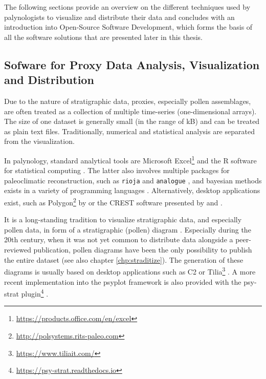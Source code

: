 \begin{refsection}
The following sections provide an overview on the different techniques used by palynologists to visualize and distribute their data and concludes with an introduction into Open-Source Software Development, which forms the basis of all the software solutions that are presented later in this thesis.

\subsection{Sofware for Proxy Data Analysis, Visualization and Distribution} \label{sec:intro-software-data}

Due to the nature of stratigraphic data, proxies, especially pollen assemblages, are often treated as a collection of multiple time-series (one-dimensional arrays). The size of one dataset is generally small (in the range of kB) and can be treated as plain text files. Traditionally, numerical and statistical analysis are separated from the visualization.

In palynology, standard analytical tools are Microsoft Excel\footnote{\url{https://products.office.com/en/excel}} and the R software for statistical computing \citep{RCT2019}. The latter also involves multiple packages for paleoclimatic reconstruction, such as \texttt{rioja} \citep{Juggins2017} and \texttt{analogue} \citep{SimpsonOksanen2019, Simpson2007}, and bayesian methods exists in a variety of programming languages \citep[e.g.][]{NolanTiptonBoothEtAl2019, Tipton2019, HaslettWhileyBhattacharyaEtAl2006,ParnellSweeneyDoanEtAl2015, HolmstroemIlvonenSeppaeEtAl2015}. Alternatively, desktop applications exist, such as Polygon\footnote{\url{http://polsystems.rits-paleo.com}} by \cite{NakagawaTarasovNishidaEtAl2002} or the CREST software presented by \cite{ChevalierCheddadiChase2014} and \cite{Chevalier2019}.

It is a long-standing tradition to visualize stratigraphic data, and especially pollen data, in form of a stratigraphic (pollen) diagram \citep{Bradley1985, Grimm1988}. Especially during the 20th century, when it was not yet common to distribute data alongside a peer-reviewed publication, pollen diagrams have been the only possibility to publish the entire dataset (see also chapter \ref{chp:straditize}). The generation of these diagrams is usually based on desktop applications such as C2 \citep{Juggins2007} or Tilia\footnote{\url{https://www.tiliait.com/}} \citep{Grimm1988, Grimm1991}. A more recent implementation into the psyplot framework \citep[chapter \ref{chp:psyplot}]{Sommer2017} is also provided with the psy-strat plugin\footnote{\url{https://psy-strat.readthedocs.io}} \citep{Sommer2019}.


\end{refsection}
